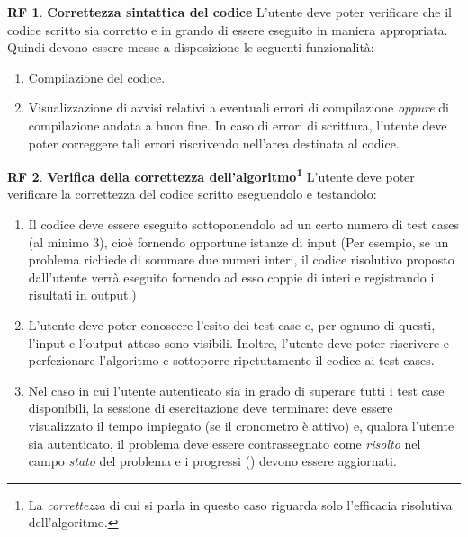 \documentclass[11pt, a4paper]{article}
\theoremstyle{definition}
\newtheorem{funcreq}{RF} %
\begin{document}
\begin{funcreq}
\label{sintax}
\textbf{Correttezza sintattica del codice }
L'utente deve poter verificare che il codice scritto sia corretto e in grando di essere eseguito in maniera appropriata.
Quindi devono essere messe a disposizione le seguenti funzionalità:
\begin{enumerate}
    \item Compilazione del codice.
    \item Visualizzazione di avvisi relativi a eventuali errori di compilazione
    \textit{oppure} di compilazione andata a buon fine. In caso di errori
    di scrittura, l'utente deve poter correggere tali errori riscrivendo
    nell'area destinata al codice.
\end{enumerate}
\end{funcreq}

\begin{funcreq}
\label{test}
\textbf{Verifica della correttezza dell'algoritmo\footnote{La \textit{correttezza} di cui si parla in questo caso riguarda solo l'efficacia risolutiva dell'algoritmo.} }
L'utente deve poter verificare la correttezza del codice scritto eseguendolo
e testandolo:
\begin{enumerate}
    \item Il codice deve essere eseguito sottoponendolo ad un certo numero
    di test cases (al minimo 3),
    cioè fornendo opportune istanze di input (Per esempio,
    se un problema richiede di sommare due numeri interi, il codice risolutivo
    proposto dall'utente verrà eseguito fornendo ad esso coppie di interi
    e registrando i risultati in output.)

    \item L'utente deve poter conoscere l'esito dei test case e, per ognuno
    di questi, l'input e l'output atteso sono visibili.
    Inoltre, l'utente deve poter riscrivere e perfezionare l'algoritmo e
    sottoporre ripetutamente il codice ai test cases.

    \item Nel caso in cui l'utente autenticato sia in grado di superare tutti i
    test case disponibili, la sessione di esercitazione deve terminare: deve
    essere visualizzato il tempo impiegato (se il cronometro è attivo) e, qualora
    l'utente sia autenticato, il problema deve essere contrassegnato come
    \textit{risolto} nel campo \textit{stato} del problema e i progressi () devono
    essere aggiornati.
\end{enumerate}
\end{funcreq}
\end{document}
